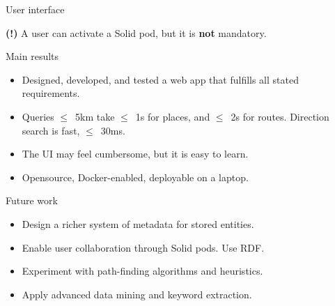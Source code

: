 \documentclass[portrait,a0paper,fontscale=0.25]{baposter}
\begin{document}
\begin{poster}
\begin{posterbox}[column=1, name=ui]{User interface}
\vspace{0.5em}

\textbf{(!)} A user can activate a Solid pod, but it is \textbf{not} mandatory.
\end{posterbox}

\begin{posterbox}[column=1, name=results, below=ui, headerColorOne=green!50, boxColorOne=green!10]{Main results}
\begin{itemize}
\item Designed, developed, and tested a web app that fulfills all stated requirements.
\item Queries $\leq$~5km take $\leq$~1s for places, and $\leq$~2s for routes. Direction search is fast, $\leq$~30ms.
\item The UI may feel cumbersome, but it is easy to learn.
\item Opensource, Docker-enabled, deployable on a laptop.
\end{itemize}
\end{posterbox}

\begin{posterbox}[column=1, name=future, below=results]{Future work}
\begin{itemize}
\item Design a richer system of metadata for stored entities.
\item Enable user collaboration through Solid pods. Use RDF.
\item Experiment with path-finding algorithms and heuristics.
\item Apply advanced data mining and keyword extraction.
\end{itemize}
\end{posterbox}


\end{poster}
\end{document}
